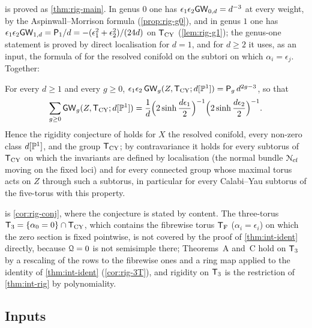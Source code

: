  is proved as \cref{thm:rig-main}. In genus $0$ one has $\epsilon_1\epsilon_2\mathsf{GW}_{0,d}=d^{-3}$ at every weight, by the Aspinwall--Morrison formula (\cref{prop:rig-g0}), and in genus $1$ one has $\epsilon_1\epsilon_2\mathsf{GW}_{1,d}=\mathsf{P}_{1}/d=-(\epsilon_1^2+\epsilon_2^2)/(24d)$ on $\mathsf{T}_{\mathrm{CY}}$ (\cref{lem:rig-g1}); the genus-one statement is proved by direct localisation for $d=1$, and for $d\geq2$ it uses, as an input, the formula of \cite{BS} for the resolved conifold on the subtori on which $\alpha_i=\epsilon_j$. Together:

\begin{cor}
\label{cor:int-conj}
For every $d\geq1$ and every $g\geq0$, $\epsilon_1\epsilon_2\,\mathsf{GW}_g(Z,\mathsf{T}_{\mathrm{CY}};d[\mathbb{P}^1])=\mathsf{P}_{g}\,d^{2g-3}$, so that
\[
\sum_{g\geq0}\mathsf{GW}_g(Z,\mathsf{T}_{\mathrm{CY}};d[\mathbb{P}^1])=\frac1d\Big(2\sinh\frac{d\epsilon_1}2\Big)^{-1}\Big(2\sinh\frac{d\epsilon_2}2\Big)^{-1}.
\]
Hence the rigidity conjecture of \cite{BS} holds for $X$ the resolved conifold, every non-zero class $d[\mathbb{P}^1]$, and the group $\mathsf{T}_{\mathrm{CY}}$; by contravariance it holds for every subtorus of $\mathsf{T}_{\mathrm{CY}}$ on which the invariants are defined by localisation (the normal bundle $\mathcal{N}_{\mathrm{cf}}$ moving on the fixed loci) and for every connected group whose maximal torus acts on $Z$ through such a subtorus, in particular for every Calabi--Yau subtorus of the five-torus with this property. 
\end{cor}

 is \cref{cor:rig-conj}, where the conjecture is stated by content. The three-torus $\mathsf{T}_{3}=\{\alpha_0=0\}\cap\mathsf{T}_{\mathrm{CY}}$, which contains the fibrewise torus $\mathsf{T}_{\mathrm{F}}$ ($\alpha_i=\epsilon_i$) on which the zero section is fixed pointwise, is not covered by the proof of \cref{thm:int-ident} directly, because $\mathcal{Q}=0$ is not semisimple there; Theorems~A and~C hold on $\mathsf{T}_{3}$ by a rescaling of the rows to the fibrewise ones and a ring map applied to the identity of \cref{thm:int-ident} (\cref{cor:rig-3T}), and rigidity on $\mathsf{T}_{3}$ is the restriction of \cref{thm:int-rig} by polynomiality.

\subsection{Inputs}
\label{sec:int-inputs}


